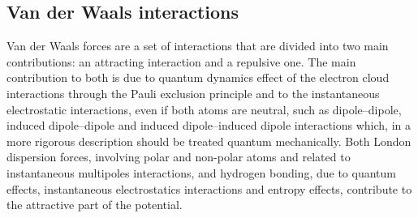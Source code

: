\subsection{Van der Waals interactions}
Van der Waals forces are a set of interactions that are divided into two main contributions: an attracting interaction and a repulsive one. The main contribution to both is due to quantum dynamics effect of the electron cloud interactions through the Pauli exclusion principle and to the instantaneous electrostatic interactions, even if both atoms are neutral, such as dipole--dipole, induced dipole--dipole and induced dipole--induced dipole interactions which, in a more rigorous description should be treated quantum mechanically. Both London dispersion forces, involving polar and non-polar atoms and related to instantaneous multipoles interactions, and hydrogen bonding, due to quantum effects, instantaneous electrostatics interactions and entropy effects, contribute to the attractive part of the potential. 

